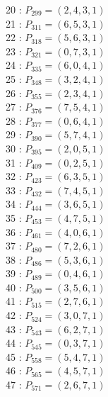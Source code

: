 \documentclass{article}
\begin{document}
{\begin{multicols}{2}
20 : $P_{299}=( 2, 4, 3, 1 )$\\
21 : $P_{311}=( 6, 5, 3, 1 )$\\
22 : $P_{318}=( 5, 6, 3, 1 )$\\
23 : $P_{321}=( 0, 7, 3, 1 )$\\
24 : $P_{335}=( 6, 0, 4, 1 )$\\
25 : $P_{348}=( 3, 2, 4, 1 )$\\
26 : $P_{355}=( 2, 3, 4, 1 )$\\
27 : $P_{376}=( 7, 5, 4, 1 )$\\
28 : $P_{377}=( 0, 6, 4, 1 )$\\
29 : $P_{390}=( 5, 7, 4, 1 )$\\
30 : $P_{395}=( 2, 0, 5, 1 )$\\
31 : $P_{409}=( 0, 2, 5, 1 )$\\
32 : $P_{423}=( 6, 3, 5, 1 )$\\
33 : $P_{432}=( 7, 4, 5, 1 )$\\
34 : $P_{444}=( 3, 6, 5, 1 )$\\
35 : $P_{453}=( 4, 7, 5, 1 )$\\
36 : $P_{461}=( 4, 0, 6, 1 )$\\
37 : $P_{480}=( 7, 2, 6, 1 )$\\
38 : $P_{486}=( 5, 3, 6, 1 )$\\
39 : $P_{489}=( 0, 4, 6, 1 )$\\
40 : $P_{500}=( 3, 5, 6, 1 )$\\
41 : $P_{515}=( 2, 7, 6, 1 )$\\
42 : $P_{524}=( 3, 0, 7, 1 )$\\
43 : $P_{543}=( 6, 2, 7, 1 )$\\
44 : $P_{545}=( 0, 3, 7, 1 )$\\
45 : $P_{558}=( 5, 4, 7, 1 )$\\
46 : $P_{565}=( 4, 5, 7, 1 )$\\
47 : $P_{571}=( 2, 6, 7, 1 )$\\
\end{multicols}
}
\end{document}
